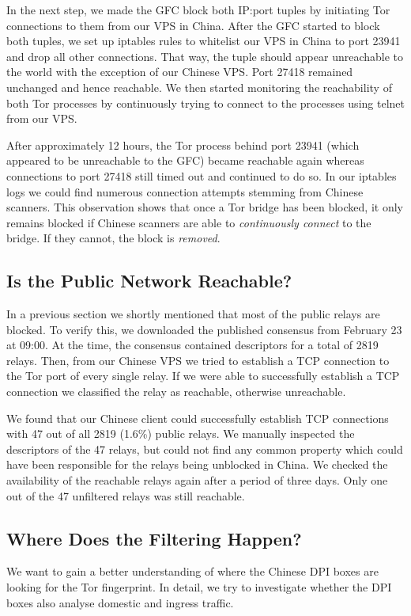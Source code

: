 \documentclass[runningheads,a4paper]{llncs}
\begin{document}
In the next step, we made the GFC block both IP:port tuples by initiating Tor connections to them
from our VPS in China. After the GFC started to block both tuples, we set up iptables
\cite{iptables} rules to whitelist our VPS in China to port 23941 and drop all other connections.
That way, the tuple should appear unreachable to the world with the exception of our Chinese VPS.
Port 27418 remained unchanged and hence reachable. We then started monitoring the reachability of
both Tor processes by continuously trying to connect to the processes using telnet from our VPS.

After approximately 12 hours, the Tor process behind port 23941 (which appeared to be unreachable to
the GFC) became reachable again whereas connections to port 27418 still timed out and continued to
do so. In our iptables logs we could find numerous connection attempts stemming from Chinese
scanners. This observation shows that once a Tor bridge has been blocked, it only remains
blocked if Chinese scanners are able to \emph{continuously connect} to the bridge. If they cannot,
the block is \emph{removed}.

\subsection{Is the Public Network Reachable?}
In a previous section we shortly mentioned that most of the public relays are blocked. To verify
this, we downloaded the published consensus from February 23 at 09:00. At the time, the
consensus contained descriptors for a total of 2819 relays. Then, from our Chinese VPS we tried to
establish a TCP connection to the Tor port of every single relay. If we were able to successfully
establish a TCP connection we classified the relay as reachable, otherwise unreachable.

We found that our Chinese client could successfully establish TCP connections with 47 out of all
2819 (1.6\%) public relays. We manually inspected the descriptors of the 47 relays, but could not
find any common property which could have been responsible for the relays being unblocked in China.
We checked the availability of the reachable relays again after a period of three days. Only
one out of the 47 unfiltered relays was still reachable.

\subsection{Where Does the Filtering Happen?}
We want to gain a better understanding of where the Chinese DPI boxes are looking for the Tor
fingerprint. In detail, we try to investigate whether the DPI boxes also analyse domestic and
ingress traffic.
\end{document}
